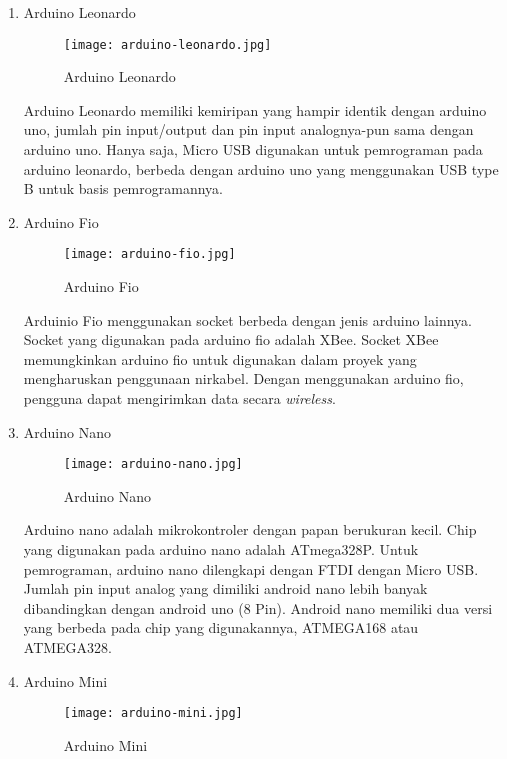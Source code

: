 \begin{enumerate}
    \item Arduino Leonardo
    
    \begin{figure}[H]
    	\centering  
    	\texttt{[image: arduino-leonardo.jpg]}  
    	\caption[Arduino Leonardo]{Arduino Leonardo} 
    	\label{fig:Arduino Leonardo} 
    \end{figure} 
    
    Arduino Leonardo memiliki kemiripan yang hampir identik dengan arduino uno, jumlah pin input/output dan pin input analognya-pun sama dengan arduino uno. Hanya saja, Micro USB digunakan untuk pemrograman pada arduino leonardo, berbeda dengan arduino uno yang menggunakan USB type B untuk basis pemrogramannya.
    
    \item Arduino Fio
    
    \begin{figure}[H]
    	\centering  
    	\texttt{[image: arduino-fio.jpg]}  
    	\caption[Arduino Fio]{Arduino Fio} 
    	\label{fig:Arduino Fio} 
    \end{figure} 
    
    Arduinio Fio menggunakan socket berbeda dengan jenis arduino lainnya. Socket yang digunakan pada arduino fio adalah XBee. Socket XBee memungkinkan arduino fio untuk digunakan dalam proyek yang mengharuskan penggunaan nirkabel. Dengan menggunakan arduino fio, pengguna dapat mengirimkan data secara \textit{wireless}.
    
    \item Arduino Nano
    
    \begin{figure}[H]
    	\centering  
    	\texttt{[image: arduino-nano.jpg]}  
    	\caption[Arduino Nano]{Arduino Nano} 
    	\label{fig:Arduino Nano} 
    \end{figure} 
    
    Arduino nano adalah mikrokontroler dengan papan berukuran kecil. Chip yang digunakan pada arduino nano adalah ATmega328P. Untuk pemrograman, arduino nano dilengkapi dengan FTDI dengan Micro USB. Jumlah pin input analog yang dimiliki android nano lebih banyak dibandingkan dengan android uno (8 Pin). Android nano memiliki dua versi yang berbeda pada chip yang digunakannya, ATMEGA168 atau ATMEGA328.
    
    \item Arduino Mini
    
    \begin{figure}[H]
    	\centering  
    	\texttt{[image: arduino-mini.jpg]}  
    	\caption[Arduino Mini]{Arduino Mini} 
    	\label{fig:Arduino Mini} 
    \end{figure} 
    

\end{enumerate}
